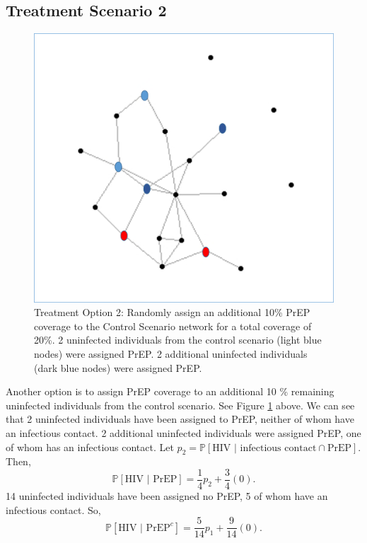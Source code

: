 \documentclass{article}
\theoremstyle{definition}
\begin{document}
\subsection{Treatment Scenario 2} 
\begin{figure}[H]
    \centering
    \includegraphics[scale=0.5]{Network Example 4.png}
    \caption{Treatment Option 2: Randomly assign an additional 10\% PrEP coverage to the Control Scenario network for a total coverage of 20\%. 2 uninfected individuals from the control scenario (light blue nodes) were assigned PrEP. 2 additional uninfected individuals (dark blue nodes) were assigned PrEP. }
    \label{fig:Figure 5}
\end{figure}

Another option is to assign PrEP coverage to an additional 10 \% remaining uninfected individuals from the control scenario. See Figure \ref{fig:Figure 5} above. 
We can see that 2 uninfected individuals have been assigned to PrEP, neither of whom have an infectious contact. 2 additional uninfected individuals were assigned PrEP, one of whom has an infectious contact. Let $p_{2}=\mathbb{P}\left[\text{HIV } \vert \text{ infectious contact} \cap \text{PrEP}\right].$ Then, $$\mathbb{P}\left[\text{HIV } \vert \text{ PrEP}\right]=\frac{1}{4}p_{2}+\frac{3}{4}\left(0\right).$$  
14 uninfected individuals have been assigned no PrEP, 5 of whom have an infectious contact. So, $$\mathbb{P}\left[\text{HIV } \vert \text{ PrEP}^{c}\right]=\frac{5}{14}p_{1}+\frac{9}{14}\left(0\right).$$
\end{document}
